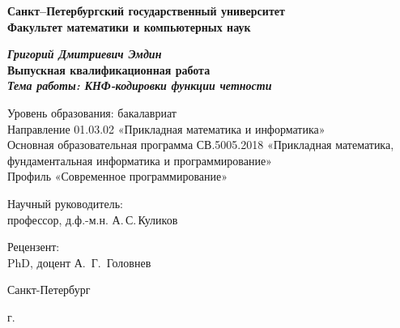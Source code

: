 \begin{titlepage}
\begin{center}

\textbf{Санкт--Петербургский государственный университет}\\
\textbf{Факультет математики и компьютерных наук}


\vspace{35mm}

\textbf{\textit{\large Григорий Дмитриевич Эмдин}} \\[8mm]
\textbf{\large Выпускная квалификационная работа}\\[3mm]
\textbf{\textit{\large Тема работы: КНФ-кодировки функции четности}}

\vspace{20mm}
Уровень образования: бакалавриат\\
Направление 01.03.02 «Прикладная математика и информатика»\\
Основная образовательная программа СВ.5005.2018
«Прикладная математика, фундаментальная информатика и программирование»\\
Профиль «Современное программирование»\\[25mm]


\begin{flushright}
\begin{minipage}[t]{0.65\textwidth}
{Научный руководитель:} \\
профессор, д.ф.-м.н. А.\,С.\,Куликов
\vspace{10mm}

{Рецензент:} \\
PhD, доцент А.\, Г.\, Головнев
\end{minipage}
\end{flushright}

\vfill

{Санкт-Петербург}
\par{\the\year{} г.}
\end{center}
\end{titlepage}
\restoregeometry
\addtocounter{page}{1}
